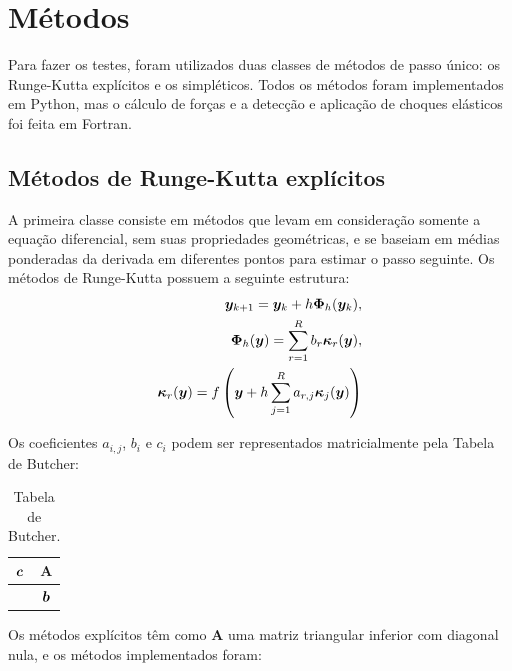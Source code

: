 \section{Métodos}

Para fazer os testes, foram utilizados duas classes de métodos de passo único: os Runge-Kutta explícitos e os simpléticos. Todos os métodos foram implementados em Python, mas o cálculo de forças e a detecção e aplicação de choques elásticos foi feita em Fortran.

\subsection{Métodos de Runge-Kutta explícitos}

A primeira classe consiste em métodos que levam em consideração somente a equação diferencial, sem suas propriedades geométricas, e se baseiam em médias ponderadas da derivada em diferentes pontos para estimar o passo seguinte. Os métodos de Runge-Kutta possuem a seguinte estrutura:
\begin{align*}
  \bm y_{k+1} = \bm y_k + h \bm \Phi_h(\bm y_k), \\
  \bm \Phi_h(\bm y) = \sum_{r=1}^R b_r \bm \kappa_r (\bm y), \\
  \bm \kappa_r(\bm y) = f\left(\bm y + h \sum_{j=1}^R a_{r,j} \bm \kappa_j (\bm y)\right)
\end{align*}

Os coeficientes $a_{i,j}$, $b_i$ e $c_i$ podem ser representados matricialmente pela Tabela de Butcher:
\begin{table}[H]
  \centering
  \begin{tabular}{c|c}
        $\bm c$ & $\bm A$\\
        \hline
                & $\bm b$
  \end{tabular}
  \caption{Tabela de Butcher.}
\end{table}
Os métodos explícitos têm como $\bm A$ uma matriz triangular inferior com diagonal nula, e os métodos implementados foram:

